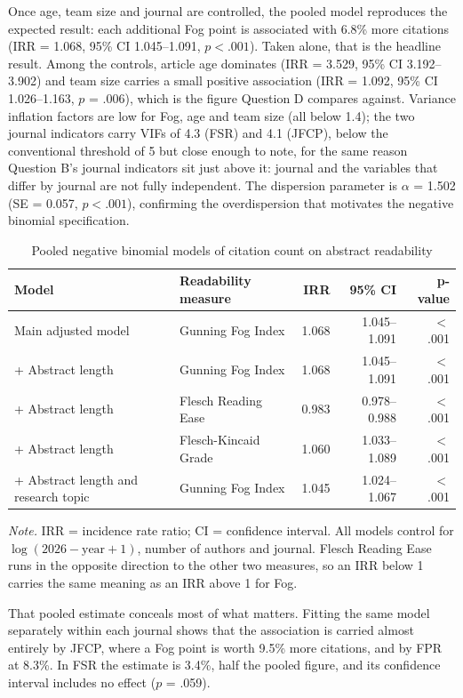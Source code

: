 \documentclass[11pt,a4paper]{article}
\newcommand{\tablenote}[1]{\par\smallskip\parbox{\linewidth}{\footnotesize\textit{Note.} #1}}
\begin{document}
Once age, team size and journal are controlled, the pooled model reproduces the expected result: each additional Fog point is associated with 6.8\% more citations (IRR = 1.068, 95\% CI 1.045--1.091, \(p < .001\)). Taken alone, that is the headline result. Among the controls, article age dominates (IRR = 3.529, 95\% CI 3.192--3.902) and team size carries a small positive association (IRR = 1.092, 95\% CI 1.026--1.163, \(p\) = .006), which is the figure Question D compares against. Variance inflation factors are low for Fog, age and team size (all below 1.4); the two journal indicators carry VIFs of 4.3 (FSR) and 4.1 (JFCP), below the conventional threshold of 5 but close enough to note, for the same reason Question B's journal indicators sit just above it: journal and the variables that differ by journal are not fully independent. The dispersion parameter is \(\alpha\) = 1.502 (SE = 0.057, \(p < .001\)), confirming the overdispersion that motivates the negative binomial specification.

\begin{table}[htbp]
\centering
\small
\caption{Pooled negative binomial models of citation count on abstract readability}
\label{tab:qc_models}
\begin{tabular}{llrrr}
\toprule
Model & Readability measure & IRR & 95\% CI & p-value \\
\midrule
Main adjusted model & Gunning Fog Index & 1.068 & 1.045--1.091 & $<$ .001 \\
+ Abstract length & Gunning Fog Index & 1.068 & 1.045--1.091 & $<$ .001 \\
+ Abstract length & Flesch Reading Ease & 0.983 & 0.978--0.988 & $<$ .001 \\
+ Abstract length & Flesch-Kincaid Grade & 1.060 & 1.033--1.089 & $<$ .001 \\
+ Abstract length and research topic & Gunning Fog Index & 1.045 & 1.024--1.067 & $<$ .001 \\
\bottomrule
\end{tabular}
\tablenote{IRR = incidence rate ratio; CI = confidence interval. All models control for $\log(2026-\text{year}+1)$, number of authors and journal. Flesch Reading Ease runs in the opposite direction to the other two measures, so an IRR below 1 carries the same meaning as an IRR above 1 for Fog.}
\end{table}

That pooled estimate conceals most of what matters. Fitting the same model separately within each journal shows that the association is carried almost entirely by JFCP, where a Fog point is worth 9.5\% more citations, and by FPR at 8.3\%. In FSR the estimate is 3.4\%, half the pooled figure, and its confidence interval includes no effect (\(p\) = .059).
\end{document}
